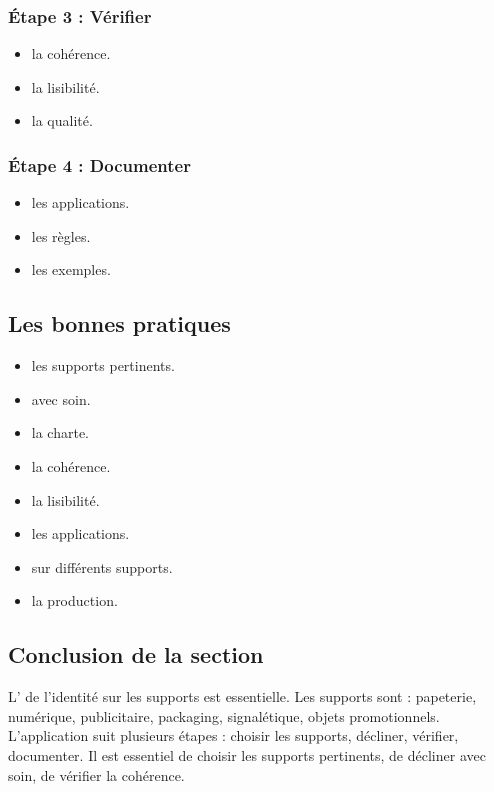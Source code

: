 \subsubsection{Étape 3 : Vérifier}

\begin{itemize}
    \item {} la cohérence.
    \item {} la lisibilité.
    \item {} la qualité.
\end{itemize}

\subsubsection{Étape 4 : Documenter}

\begin{itemize}
    \item {} les applications.
    \item {} les règles.
    \item {} les exemples.
\end{itemize}

\subsection{Les bonnes pratiques}

\begin{itemize}
    \item {} les supports pertinents.
    \item {} avec soin.
    \item {} la charte.
    \item {} la cohérence.
    \item {} la lisibilité.
    \item {} les applications.
    \item {} sur différents supports.
    \item {} la production.
\end{itemize}

\subsection*{Conclusion de la section}

L' de l'identité sur les supports est essentielle. Les supports sont : papeterie, numérique, publicitaire, packaging, signalétique, objets promotionnels. L'application suit plusieurs étapes : choisir les supports, décliner, vérifier, documenter. Il est essentiel de choisir les supports pertinents, de décliner avec soin, de vérifier la cohérence.

